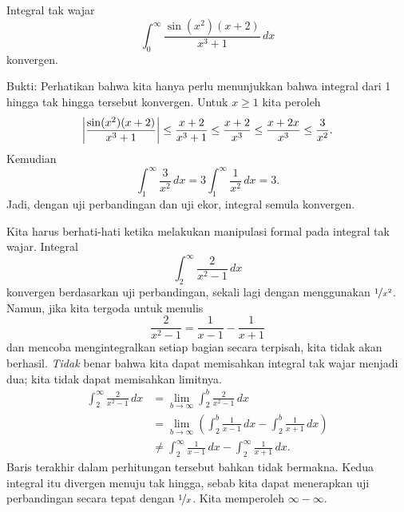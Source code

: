\begin{example}
Integral tak wajar
\begin{equation*}
\int_0^\infty \frac{\sin(x^2)(x+2)}{x^3+1} \,dx
\end{equation*}
konvergen.

Bukti:  Perhatikan bahwa kita hanya perlu menunjukkan
bahwa integral dari 1 hingga tak hingga tersebut konvergen.
Untuk $x \geq 1$ kita peroleh
\begin{equation*}
\left\lvert {\frac{\sin(x^2)(x+2)}{x^3+1}} \right\rvert
\leq
\frac{x+2}{x^3+1}
\leq \frac{x+2}{x^3} \leq
\frac{x+2x}{x^3} \leq \frac{3}{x^2} .
\end{equation*}
Kemudian
\begin{equation*}
\int_1^\infty \frac{3}{x^2}\,dx
=
3 \int_1^\infty \frac{1}{x^2}\,dx
=
3 .
\end{equation*}
Jadi, dengan uji perbandingan dan uji ekor, integral semula
konvergen.
\end{example}

\begin{example}
Kita harus berhati-hati ketika melakukan manipulasi formal pada integral
tak wajar.
Integral
\begin{equation*}
\int_2^\infty \frac{2}{x^2-1}\,dx
\end{equation*}
konvergen berdasarkan uji perbandingan, sekali lagi dengan menggunakan $\nicefrac{1}{x^2}$.  Namun, jika kita
tergoda untuk menulis
\begin{equation*}
\frac{2}{x^2-1} = 
\frac{1}{x-1}
-
\frac{1}{x+1} 
\end{equation*}
dan mencoba mengintegralkan setiap bagian secara terpisah, kita tidak akan berhasil.
\emph{Tidak} benar bahwa kita dapat memisahkan integral tak
wajar menjadi dua; kita tidak dapat memisahkan limitnya.
\begin{equation*}
\begin{split}
\int_2^\infty \frac{2}{x^2-1} \,dx &=
\lim_{b\to \infty} \int_2^b \frac{2}{x^2-1} \,dx
\\
&=
\lim_{b\to \infty}
\left(
\int_2^b \frac{1}{x-1}\,dx
-
\int_2^b \frac{1}{x+1}\,dx
\right)
\\
&\neq
\int_2^\infty \frac{1}{x-1}\,dx
-
\int_2^\infty \frac{1}{x+1}\,dx .
\end{split}
\end{equation*}
Baris terakhir dalam perhitungan tersebut bahkan tidak bermakna.  Kedua
integral itu divergen menuju tak hingga, sebab kita dapat
menerapkan uji perbandingan secara tepat dengan
$\nicefrac{1}{x}$.  Kita memperoleh $\infty - \infty$.
\end{example}

